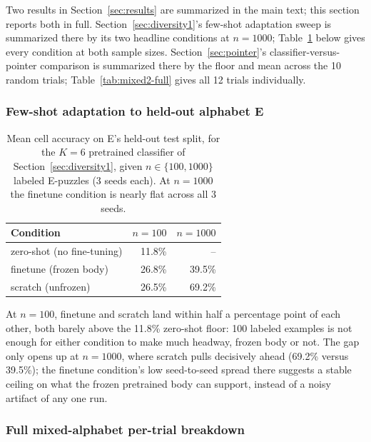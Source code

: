 \documentclass{article} %
\begin{document}
Two results in Section~\ref{sec:results} are summarized in the main
text; this section reports both in full.
Section~\ref{sec:diversity1}'s few-shot adaptation sweep is summarized
there by its two headline conditions at $n=1000$; Table~\ref{tab:fewshot}
below gives every condition at both sample sizes.
Section~\ref{sec:pointer}'s classifier-versus-pointer comparison is
summarized there by the floor and mean across the 10 random trials;
Table~\ref{tab:mixed2-full} gives all 12 trials individually.

\FloatBarrier
\subsubsection{Few-shot adaptation to held-out alphabet E}
\label{app:fewshot}

\begin{table}[h]
\centering
\small
\begin{tabular}{lrr}
\hline
Condition & $n=100$ & $n=1000$ \\
\hline
zero-shot (no fine-tuning) & 11.8\% & -- \\
finetune (frozen body) & 26.8\% & 39.5\% \\
scratch (unfrozen) & 26.5\% & 69.2\% \\
\hline
\end{tabular}
\caption{Mean cell accuracy on E's held-out test split, for the $K=6$
pretrained classifier of Section~\ref{sec:diversity1}, given $n \in
\{100, 1000\}$ labeled E-puzzles (3 seeds each). At $n=1000$ the
finetune condition is nearly flat across all 3 seeds.}
\label{tab:fewshot}
\end{table}

At $n=100$, finetune and scratch land within half a percentage point of
each other, both barely above the 11.8\% zero-shot floor: 100 labeled
examples is not enough for either condition to make much headway,
frozen body or not. The gap only opens up at $n=1000$, where scratch
pulls decisively ahead (69.2\% versus 39.5\%); the finetune condition's
low seed-to-seed spread there suggests a stable ceiling on what the
frozen pretrained body can support, instead of a noisy artifact of any
one run.

\FloatBarrier
\subsubsection{Full mixed-alphabet per-trial breakdown}
\label{app:mixed2}
\end{document}
